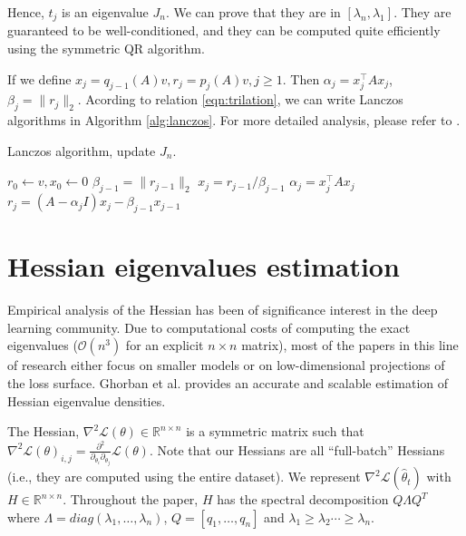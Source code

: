\documentclass[conference]{IEEEtran}
\newcommand{\R}{\mathbb{R}}
\newcommand{\loss}{\mathcal{L}}
\DeclareMathOperator{\1}{\mathbf{1}}
\newcommand{\hess}{\nabla^2 \loss}
\theoremstyle{definition}
\begin{document}
Hence, $t_j$ is an eigenvalue $J_n$. We can prove that they are in $[\lambda_n,\lambda_1]$. They are guaranteed to be well-conditioned, and they can be computed
quite efficiently using the symmetric QR algorithm. 

If we define $x_j=q_{j-1}(A)v, r_j=p_j(A)v, j\geq 1$. Then $\alpha_j=x_j^\top A x_j$, $\beta_j = \|r_j\|_2$. Acording to relation \ref{eqn:trilation}, we can write Lanczos algorithms in Algorithm \ref{alg:lanczos}. For more detailed analysis, please refer to \cite{10.5555/3045390.3045577}.

\begin{algorithm}[H]
    \caption{Lanczos algorithm, update $J_n$.}
    \begin{algorithmic}[1]
        \State $r_0\gets v, x_0\gets 0$
        \State $\beta_{j-1}=\|r_{j-1}\|_2$
        \State $x_j=r_{j-1}/\beta_{j-1}$
        \State $\alpha_j=x_j^\top A x_j$
        \State $r_j = (A-\alpha_j I)x_j-\beta_{j-1}x_{j-1}$
        \EndFor
    \end{algorithmic}
    \label{alg:lanczos}
\end{algorithm}

\section{Hessian eigenvalues estimation}
Empirical analysis of the Hessian has been of significance interest in the deep learning community.
Due to computational costs of computing the exact eigenvalues ($\mathcal{O}(n^3)$ for an explicit $n\times n$ matrix),
most of the papers in this line of research either focus on smaller models or on low-dimensional
projections of the loss surface. Ghorban et al. \cite{pmlr-v97-ghorbani19b} provides an accurate and scalable estimation of Hessian eigenvalue densities.

The Hessian, $\nabla^2 \loss(\theta) \in \R^{n \times n}$ is a symmetric matrix such that 
$\hess(\theta)_{i, j} = \frac{\partial^2}{\partial_{\theta_i}\partial_{\theta_j}} \loss(\theta)$.
Note that our Hessians are all ``full-batch'' Hessians (i.e., they are computed using the entire dataset). We represent $\nabla^2 \loss(\hat{\theta}_t)$ with $H\in \R^{n\times n}$. Throughout the paper, $H$ has the spectral decomposition $Q \Lambda Q^T$ where $\Lambda = diag(\lambda_1,\dots, \lambda_n)$, $Q=[q_1, \dots, q_n]$ and $\lambda_1 \geq \lambda_2 \cdots \geq \lambda_n$. 
\end{document}
